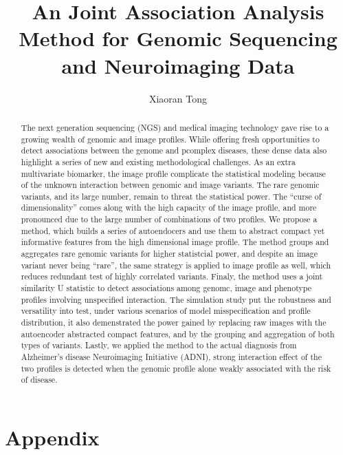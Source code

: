 \documentclass[12pt]{article}
\author{Xiaoran Tong}
\begin{document}
\title{An Joint Association Analysis Method for Genomic Sequencing and Neuroimaging Data}
\maketitle

\begin{abstract}
The next generation sequencing (NGS) and medical imaging technology gave rise to a growing wealth of genomic and image profiles. While offering fresh opportunities to detect associations between the genome and pcomplex diseases, these dense data also highlight a series of new and existing methodological challenges. As an extra multivariate biomarker, the image profile complicate the statistical modeling because of the unknown interaction between genomic and image variants. The rare genomic variants, and its large number, remain to threat the statistical power. The ``curse of dimensionality'' comes along with the high capacity of the image profile, and more pronounced due to the large number of combinations of two profiles. We propose a method, which builds a series of autoendocers and use them to abstract compact yet informative features from the high dimensional image profile. The method groups and aggregates rare genomic variants for higher statistcial power, and despite an image variant never being ``rare'', the same strategy is applied to image profile as well, which reduces redundant test of highly correlated variants. Finaly, the method uses a joint similarity U statistic to detect associations among genomc, image and phenotype profiles involving unspecified interaction. The simulation study put the robustness and versatility into test, under various scenarios of model misspecification and profile distribution, it also demenstrated the power gained by replacing raw images with the autoencoder abstracted compact features, and by the grouping and aggregation of both types of variants. Lastly, we applied the method to the actual diagnosis from Alzheimer's disease Neuroimaging Initiative (ADNI), strong interaction effect of the two profiles is detected when the genomic profile alone weakly associated with the risk of disease.
\end{abstract}






\printbibliography

\section{Appendix}


\end{document}
